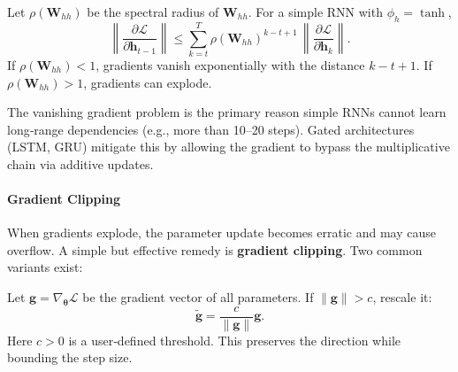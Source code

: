 \documentclass{tufte-handout}
\begin{document}
\begin{thm}
    Let $\rho(\mathbf{W}_{hh})$ be the spectral radius of $\mathbf{W}_{hh}$. For a simple RNN with $\phi_h = \tanh$,
    \[
    \left\| \frac{\partial \mathcal{L}}{\partial \mathbf{h}_{t-1}} \right\| \le \sum_{k=t}^{T} \rho(\mathbf{W}_{hh})^{k-t+1} \, \left\| \frac{\partial \mathcal{L}}{\partial \mathbf{h}_k} \right\|.
    \]
    If $\rho(\mathbf{W}_{hh}) < 1$, gradients vanish exponentially with the distance $k-t+1$. If $\rho(\mathbf{W}_{hh}) > 1$, gradients can explode.
\end{thm}

\begin{marginfigure}
\centering
{}
\caption{Exponential behaviour of gradient magnitude with sequence distance.}
\end{marginfigure}

The vanishing gradient problem is the primary reason simple RNNs cannot learn long‑range dependencies (e.g., more than 10–20 steps). Gated architectures (LSTM, GRU) mitigate this by allowing the gradient to bypass the multiplicative chain via additive updates.

\paragraph{Gradient Clipping}
When gradients explode, the parameter update becomes erratic and may cause overflow. A simple but effective remedy is \textbf{gradient clipping}. Two common variants exist:

\begin{defn}
    Let $\mathbf{g} = \nabla_{\boldsymbol{\theta}} \mathcal{L}$ be the gradient vector of all parameters. If $\|\mathbf{g}\| > c$, rescale it:
    \[
    \tilde{\mathbf{g}} = \frac{c}{\|\mathbf{g}\|} \mathbf{g}.
    \]
    Here $c > 0$ is a user‑defined threshold. This preserves the direction while bounding the step size.
\end{defn}
\end{document}
